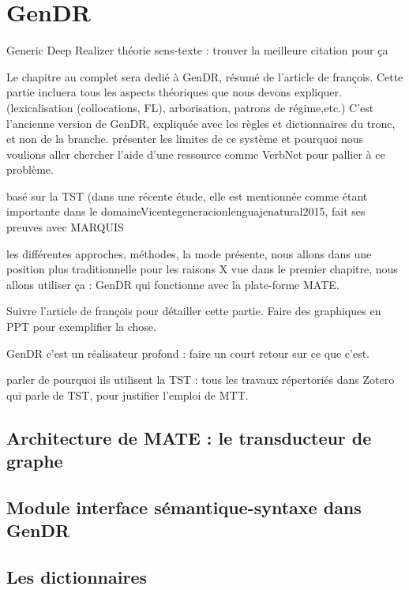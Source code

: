 
\chapter{GenDR}

Generic Deep Realizer \citep{lareau18}
théorie sens-texte : trouver la meilleure citation pour ça

Le chapitre au complet sera dedié à GenDR, résumé de l'article de françois.
Cette partie incluera tous les aspects théoriques que nous devons expliquer. (lexicalisation (collocations, FL), arborisation, patrons de régime,etc.)
C'est l'ancienne version de GenDR, expliquée avec les règles et dictionnaires du tronc, et non de la branche.
présenter les limites de ce système et pourquoi nous voulions aller chercher l'aide d'une ressource comme VerbNet pour pallier à ce problème.

basé sur la TST (dans une récente étude, elle est mentionnée comme étant importante dans le domaine{Vicentegeneracionlenguajenatural2015}, fait ses preuves avec MARQUIS

les différentes approches, méthodes, la mode présente, nous allons dans une position plus traditionnelle pour les raisons  X vue dans le premier chapitre, nous allons utiliser ça : GenDR qui fonctionne avec la plate-forme MATE.

Suivre l'article de françois pour détailler cette partie.
Faire des graphiques en PPT pour exemplifier la chose.

GenDR c'est un réalisateur profond : faire un court retour sur ce que c'est.

parler de pourquoi ils utilisent la TST : tous les travaux répertoriés dans Zotero qui parle de TST, pour justifier l'emploi de MTT.

\section{Architecture de MATE : le transducteur de graphe}

\section{Module interface sémantique-syntaxe dans GenDR}

\section{Les dictionnaires}

